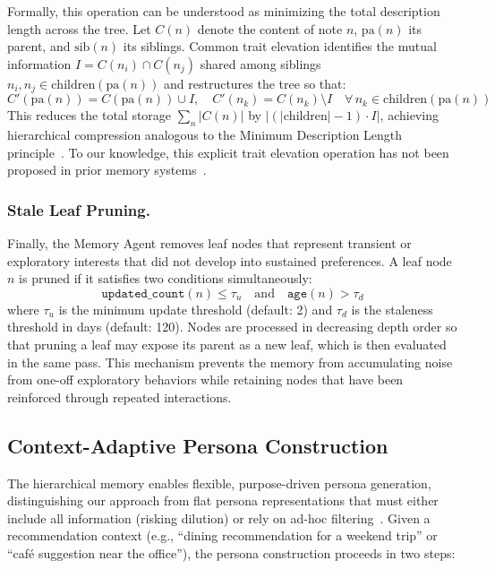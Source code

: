 \documentclass[manuscript,screen,review]{acmart}
\begin{document}
Formally, this operation can be understood as minimizing the total description length across the tree. Let $C(n)$ denote the content of note $n$, $\text{pa}(n)$ its parent, and $\text{sib}(n)$ its siblings. Common trait elevation identifies the mutual information $I = C(n_i) \cap C(n_j)$ shared among siblings $n_i, n_j \in \text{children}(\text{pa}(n))$ and restructures the tree so that:
\begin{equation}
    C'(\text{pa}(n)) = C(\text{pa}(n)) \cup I, \quad C'(n_k) = C(n_k) \setminus I \quad \forall\, n_k \in \text{children}(\text{pa}(n))
\end{equation}
This reduces the total storage $\sum_n |C(n)|$ by $|(|\text{children}| - 1) \cdot I|$, achieving hierarchical compression analogous to the Minimum Description Length principle~\cite{mdl}. To our knowledge, this explicit trait elevation operation has not been proposed in prior memory systems~\cite{mem0,amem,personamem-v2,emem}.

\subsubsection{Stale Leaf Pruning.}
Finally, the Memory Agent removes leaf nodes that represent transient or exploratory interests that did not develop into sustained preferences. A leaf node $n$ is pruned if it satisfies two conditions simultaneously:
\begin{equation}
    \texttt{updated\_count}(n) \leq \tau_u \quad \text{and} \quad \texttt{age}(n) > \tau_d
\end{equation}
where $\tau_u$ is the minimum update threshold (default: 2) and $\tau_d$ is the staleness threshold in days (default: 120). Nodes are processed in decreasing depth order so that pruning a leaf may expose its parent as a new leaf, which is then evaluated in the same pass. This mechanism prevents the memory from accumulating noise from one-off exploratory behaviors while retaining nodes that have been reinforced through repeated interactions.


\subsection{Context-Adaptive Persona Construction}

The hierarchical memory enables flexible, purpose-driven persona generation, distinguishing our approach from flat persona representations that must either include all information (risking dilution) or rely on ad-hoc filtering~\cite{persona-db}. Given a recommendation context (e.g., ``dining recommendation for a weekend trip'' or ``caf\'{e} suggestion near the office''), the persona construction proceeds in two steps:
\end{document}
